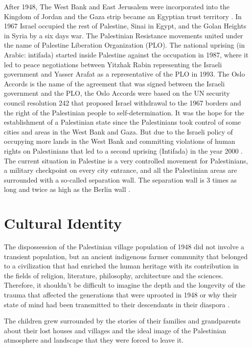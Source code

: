 After 1948, The West Bank and East Jerusalem were incorporated into the Kingdom of Jordan and the Gaza strip became an Egyptian trust territory \citep{Houdaille2010}. In 1967 Israel occupied the rest of Palestine, Sinai in Egypt, and the Golan Heights in Syria by a six days war. The Palestinian Resistance movements united under the name of Palestine Liberation Organization (PLO). The national uprising (in Arabic: intifada) started inside Palestine against the occupation in 1987, where it led to peace negotiations between Yitzhak Rabin representing the Israeli government and Yasser Arafat as a representative of the PLO in 1993. The Oslo Accords is the name of the agreement that was signed between the Israeli government and the PLO, the Oslo Accords were based on the UN security council resolution 242 that proposed Israel withdrawal to the 1967 borders and the right of the Palestinian people to self-determination. It was the hope for the establishment of a Palestinian state since the Palestinians took control of some cities and areas in the West Bank and Gaza. But due to the Israeli policy of occupying more lands in the West Bank and committing violations of human rights on Palestinians that led to a second uprising (Intifada) in the year 2000 \citep{Shalhoub-Kevorkian2006}. The current situation in Palestine is a very controlled movement for Palestinians, a military checkpoint on every city entrance, and all the Palestinian areas are surrounded with a so-called separation wall. The separation wall is 3 times as long and twice as high as the Berlin wall \citep{Shalhoub-Kevorkian2006}.



\section{Cultural Identity}
 
 The dispossession of the Palestinian village population of 1948 did not involve a transient population, but an ancient indigenous farmer community that belonged to a civilization that had enriched the human heritage with its contribution in the fields of religion, literature, philosophy, architecture and the sciences. Therefore, it shouldn't be difficult to imagine the depth and the longevity of the trauma that affected the generations that were uprooted in 1948 or why their state of mind had been transmitted to their descendants in their diaspora \citep{Khalidi2015}.
 
 The children grew surrounded by the stories of their families and grandparents about their lost houses and villages and the ideal image of the Palestinian atmosphere and landscape that they were forced to leave it.  


